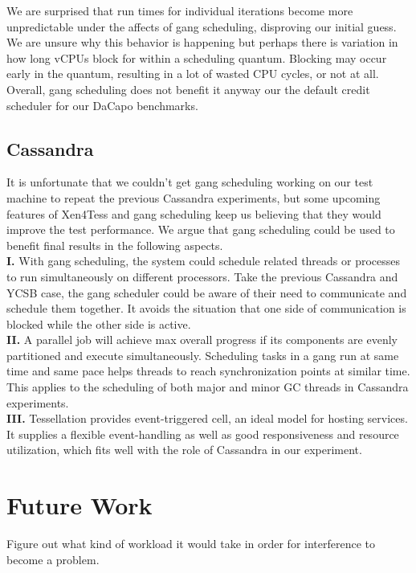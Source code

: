 \documentclass{sig-alternate}
\begin{document}
We are surprised that run times for individual iterations become more unpredictable under the affects of gang scheduling, disproving our initial guess. We are unsure why this behavior is happening but perhaps there is variation in how long vCPUs block for within a scheduling quantum. Blocking may occur early in the quantum, resulting in a lot of wasted CPU cycles, or not at all. Overall, gang scheduling does not benefit it anyway our the default credit scheduler for our DaCapo benchmarks.

\subsection{Cassandra}
It is unfortunate that we couldn't get gang scheduling working on our test machine to repeat the previous Cassandra experiments, but some upcoming features of Xen4Tess and gang scheduling keep us believing that they would improve the test performance. We argue that gang scheduling could be used to benefit final results in the following aspects\cite{feitelson1992gang}.
\\\textbf{I.} With gang scheduling, the system could schedule related threads or processes to run simultaneously on different processors. Take the previous Cassandra and YCSB case, the gang scheduler could be aware of their need to communicate and schedule them together. It avoids the situation that one side of communication is blocked while the other side is active.
\\\textbf{II.} A parallel job will achieve max overall progress if its components are evenly partitioned and execute simultaneously. Scheduling tasks in a gang run at same time and same pace helps threads to reach synchronization points at similar time. This applies to the scheduling of both major and minor GC threads in Cassandra experiments.
\\\textbf{III.} Tessellation provides event-triggered cell, an ideal model for hosting services. It supplies a flexible event-handling as well as good responsiveness and resource utilization, which fits well with the role of Cassandra in our experiment\cite{colmenares2013tessellation}.


\section{Future Work}

Figure out what kind of workload it would take in order for interference to become a problem.
\end{document}
